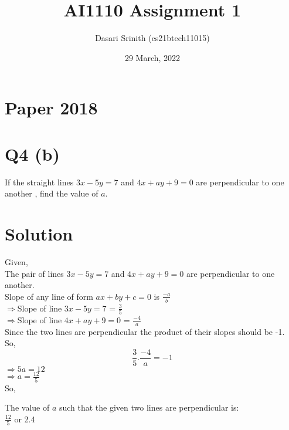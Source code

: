 \documentclass[12pt]{article}
\title{AI1110 Assignment 1}
\author{Dasari Srinith (cs21btech11015)}
\date{29 March, 2022}
\begin{document}
\maketitle
\section*{Paper 2018}

\section*{Q4 (b)}

    If the straight lines $3x - 5y = 7$ and $4x + a y + 9 = 0$ are perpendicular to one another , find the value of $a$.
    
\section*{Solution}

    Given,\\
    The pair of lines $3x - 5y = 7$ and $4x + a y + 9 = 0$ are perpendicular to 
    one another.\\
    Slope of any line of form $ax + by + c = 0$ is $\displaystyle\frac{-a}{b}$\\
    $\Rightarrow$Slope of line $3x - 5y = 7$ = $\displaystyle\frac{3}{5}$\\
    $\Rightarrow$Slope of line $4x + a y + 9 = 0$ = $\displaystyle\frac{-4}{a}$\\
    Since the two lines are perpendicular the product of their
    slopes should be -1.\\
    So,
    $$\frac{3}{5} . \frac{-4}{a} = -1$$
    $\Rightarrow 5a = 12 $\\
    $\Rightarrow a = \frac{12}{5} $\\
    So,
    
    The value of $a$ such that the given two lines are perpendicular is:\\
    $\displaystyle\frac{12}{5}$ or 2.4
    
\end{document}
